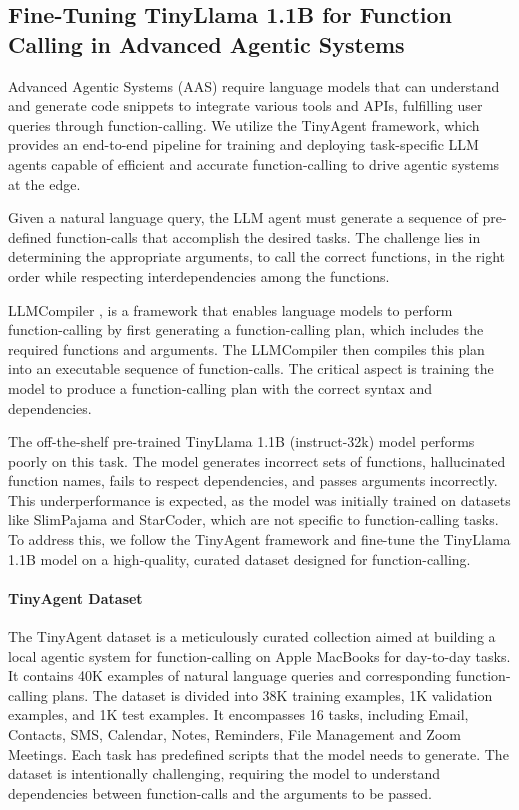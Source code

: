 \vspace{-2mm}

\subsection{Fine-Tuning TinyLlama 1.1B for Function Calling in Advanced Agentic Systems}

Advanced Agentic Systems (AAS) require language models that can understand and generate code snippets to integrate various tools and APIs, fulfilling user queries through function-calling. We utilize the TinyAgent framework, which provides an end-to-end pipeline for training and deploying task-specific LLM agents capable of efficient and accurate function-calling \citep{erdogan2024tinyagent} to drive agentic systems at the edge.

Given a natural language query, the LLM agent must generate a sequence of pre-defined function-calls that accomplish the desired tasks. The challenge lies in determining the appropriate arguments, to call the correct functions, in the right order while respecting interdependencies among the functions.

LLMCompiler \citet{kim2023llmcompiler}, is a framework that enables language models to perform function-calling by first generating a function-calling plan, which includes the required functions and arguments. The LLMCompiler then compiles this plan into an executable sequence of function-calls. The critical aspect is training the model to produce a function-calling plan with the correct syntax and dependencies.

The off-the-shelf pre-trained TinyLlama 1.1B (instruct-32k) model performs poorly on this task. The model generates incorrect sets of functions, hallucinated function names, fails to respect dependencies, and passes arguments incorrectly. This underperformance is expected, as the model was initially trained on datasets like SlimPajama and StarCoder, which are not specific to function-calling tasks. To address this, we follow the TinyAgent framework \citep{erdogan2024tinyagent} and fine-tune the TinyLlama 1.1B model on a high-quality, curated dataset designed for function-calling.

\paragraph{TinyAgent Dataset}

The TinyAgent dataset \citep{erdogan2024tinyagent} is a meticulously curated collection aimed at building a local agentic system for function-calling on Apple MacBooks for day-to-day tasks. It contains 40K examples of natural language queries and corresponding function-calling plans. The dataset is divided into 38K training examples, 1K validation examples, and 1K test examples. It encompasses 16 tasks, including Email, Contacts, SMS, Calendar, Notes, Reminders, File Management and Zoom Meetings. Each task has predefined scripts that the model needs to generate. The dataset is intentionally challenging, requiring the model to understand dependencies between function-calls and the arguments to be passed.

